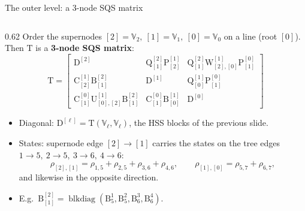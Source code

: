 \documentclass[aspectratio=169,11pt]{beamer}
\begin{document}
\begin{frame}{The outer level: a 3-node SQS matrix}
\begin{columns}[c]
\begin{column}{0.62\textwidth}
\footnotesize
Order the supernodes $[2]{=}\mathbb{V}_2,\ [1]{=}\mathbb{V}_1,\ [0]{=}\mathbb{V}_0$ on a line (root $[0]$).
Then $\mathrm{T}$ is a \textbf{3-node SQS matrix}:
\[
\mathrm{T}=
\begin{bmatrix}
\mathrm{D}^{[2]} & \mathrm{Q}^{[2]}_{[1]}\mathrm{P}^{[1]}_{[2]} & \mathrm{Q}^{[2]}_{[1]}\mathrm{W}^{[1]}_{[2],[0]}\mathrm{P}^{[0]}_{[1]} \\[2pt]
\mathrm{C}^{[1]}_{[2]}\mathrm{B}^{[2]}_{[1]} & \mathrm{D}^{[1]} & \mathrm{Q}^{[1]}_{[0]}\mathrm{P}^{[0]}_{[1]} \\[2pt]
\mathrm{C}^{[0]}_{[1]}\mathrm{U}^{[1]}_{[0],[2]}\mathrm{B}^{[2]}_{[1]} & \mathrm{C}^{[0]}_{[1]}\mathrm{B}^{[1]}_{[0]} & \mathrm{D}^{[0]}
\end{bmatrix}
\]
\begin{itemize}
\item Diagonal: $\mathrm{D}^{[\ell]}=\mathrm{T}(\mathbb{V}_\ell,\mathbb{V}_\ell)$, the HSS blocks of the previous slide.
\item States: supernode edge $[2]\to[1]$ carries the states on the tree edges
  $1{\to}5,\ 2{\to}5,\ 3{\to}6,\ 4{\to}6$:
  \[ \rho_{[2],[1]}=\rho_{1,5}+\rho_{2,5}+\rho_{3,6}+\rho_{4,6},
     \qquad \rho_{[1],[0]}=\rho_{5,7}+\rho_{6,7}, \]
  and likewise in the opposite direction.
\item E.g.\ $\mathrm{B}^{[2]}_{[1]}=\operatorname{blkdiag}(\mathrm{B}^1_5,\mathrm{B}^2_5,\mathrm{B}^3_6,\mathrm{B}^4_6)$.
\end{itemize}
\end{column}
\end{columns}
\end{frame}
\end{document}

